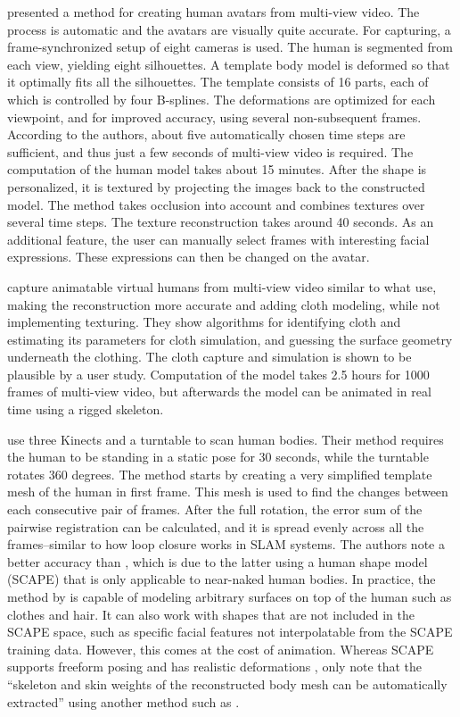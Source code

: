 \citet{ahmed2005automatic} presented a method for creating human avatars from multi-view video. The process is automatic and the avatars are visually quite accurate. For capturing, a frame-synchronized setup of eight cameras is used. The human is segmented from each view, yielding eight silhouettes. A template body model is deformed so that it optimally fits all the silhouettes. The template consists of 16 parts, each of which is controlled by four B-splines. The deformations are optimized for each viewpoint, and for improved accuracy, using several non-subsequent frames. According to the authors, about five automatically chosen time steps are sufficient, and thus just a few seconds of multi-view video is required. The computation of the human model takes about 15 minutes. After the shape is personalized, it is textured by projecting the images back to the constructed model. The method takes occlusion into account and combines textures over several time steps. The texture reconstruction takes around 40 seconds. As an additional feature, the user can manually select frames with interesting facial expressions. These expressions can then be changed on the avatar. \citep{ahmed2005automatic}

\citet{stoll2010video} capture animatable virtual humans from multi-view video similar to what \citet{ahmed2005automatic} use, making the reconstruction more accurate and adding cloth modeling, while not implementing texturing. They show algorithms for identifying cloth and estimating its parameters for cloth simulation, and guessing the surface geometry underneath the clothing. The cloth capture and simulation is shown to be plausible by a user study. Computation of the model takes 2.5 hours for 1000 frames of multi-view video, but afterwards the model can be animated in real time using a rigged skeleton. \citep{stoll2010video}

\citet{tongscanning} use three Kinects and a turntable to scan human bodies. Their method requires the human to be standing in a static pose for 30 seconds, while the turntable rotates 360 degrees. The method starts by creating a very simplified template mesh of the human in first frame. This mesh is used to find the changes between each consecutive pair of frames. After the full rotation, the error sum of the pairwise registration can be calculated, and it is spread evenly across all the frames--similar to how loop closure works in SLAM systems. The authors note a better accuracy than \citep{weiss2011home}, which is due to the latter using a human shape model (SCAPE) that is only applicable to near-naked human bodies. In practice, the method by \citeauthor{tongscanning} is capable of modeling arbitrary surfaces on top of the human such as clothes and hair. It can also work with shapes that are not included in the SCAPE space, such as specific facial features not interpolatable from the SCAPE training data. However, this comes at the cost of animation. Whereas SCAPE supports freeform posing and has realistic deformations \citep{anguelov2005scape}, \citet{tongscanning} only note that the ``skeleton and skin weights of the reconstructed body mesh can be automatically extracted'' using another method such as \citep{baran2007automatic}.

